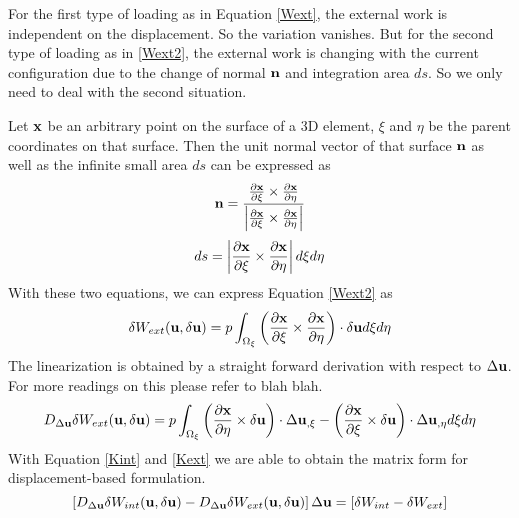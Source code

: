 For the first type of loading as in Equation \ref{Wext}, the external work is independent on the displacement. So the variation vanishes. But for the second type of loading as in \ref{Wext2}, the external work is changing with the current configuration due to the change of normal $\bold{n}$ and integration area $ds$. So we only need to deal with the second situation.

Let $\bold{x}$ be an arbitrary point on the surface of a 3D element, $\xi$ and $\eta$ be the parent coordinates on that surface. Then the unit normal vector of that surface $\bold{n}$ as well as the infinite small area $ds$ can be expressed as
\begin{equation}
\bold{n} = \frac{  \frac{\partial{\bold{x}}}{\partial{\xi}} \times  \frac{\partial{\bold{x}}}{\partial{\eta}} }{\left| \frac{\partial{\bold{x}}}{\partial{\xi}} \times  \frac{\partial{\bold{x}}}{\partial{\eta}} \right|}
\end{equation}
\begin{equation}
ds = \left|\frac{\partial{\bold{x}}}{\partial{\xi}} \times  \frac{\partial{\bold{x}}}{\partial{\eta}}\right| d\xi{d\eta}
\end{equation}
With these two equations, we can express Equation \ref{Wext2} as
\begin{equation} \label{Kext}
\delta{W_{ext}}(\bold{u}, \delta{\bold{u}}) = p\int_{\Omega_{\xi}}  \left(\frac{\partial{\bold{x}}}{\partial{\xi}} \times  \frac{\partial{\bold{x}}}{\partial{\eta}}\right) \cdot\delta{\bold{u}}d\xi{d\eta}
\end{equation}
The linearization is obtained by a straight forward derivation with respect to $\Delta\bold{u}$. For more readings on this please refer to blah blah.
\begin{equation}
D_{\Delta{\bold{u}}}\delta{W_{ext}}(\bold{u}, \delta{\bold{u}}) =  p\int_{\Omega_{\xi}}  \left(\frac{\partial{\bold{x}}}{\partial{\eta}} \times \delta\bold{u}\right) \cdot\Delta{\bold{u}}_{,\xi} - 
\left(\frac{\partial{\bold{x}}}{\partial{\xi}} \times \delta\bold{u}\right) \cdot\Delta{\bold{u}}_{,\eta} d\xi{d\eta}
\end{equation}
With Equation \ref{Kint} and \ref{Kext} we are able to obtain the matrix form for displacement-based formulation.
\begin{equation} \label{matrix}
\left[ D_{\Delta{\bold{u}}}\delta{W_{int}}(\bold{u}, \delta{\bold{u}}) - D_{\Delta{\bold{u}}}\delta{W_{ext}}(\bold{u}, \delta{\bold{u}}) \right] \Delta\bold{u} = \left[\delta{W_{int}} - \delta{W_{ext}}\right]
\end{equation}



